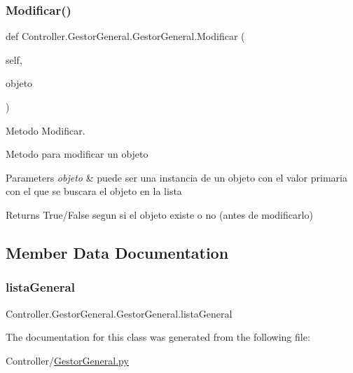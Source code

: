 \subsubsection{\texorpdfstring{Modificar()}{Modificar()}}
{\footnotesize\ttfamily def Controller.\+Gestor\+General.\+Gestor\+General.\+Modificar (\begin{DoxyParamCaption}\item[{}]{self,  }\item[{}]{objeto }\end{DoxyParamCaption})}



Metodo Modificar. 

Metodo para modificar un objeto 
\begin{DoxyParams}{Parameters}
{\em objeto} & puede ser una instancia de un objeto con el valor primaria con el que se buscara el objeto en la lista \\
\hline
\end{DoxyParams}
\begin{DoxyReturn}{Returns}
True/\+False segun si el objeto existe o no (antes de modificarlo) 
\end{DoxyReturn}


\subsection{Member Data Documentation}
\mbox{\label{class_controller_1_1_gestor_general_1_1_gestor_general_ab452eb1d569c4a9dba41ae21c833c296}} 
\subsubsection{\texorpdfstring{lista\+General}{listaGeneral}}
{\footnotesize\ttfamily Controller.\+Gestor\+General.\+Gestor\+General.\+lista\+General}



The documentation for this class was generated from the following file\+:\begin{DoxyCompactItemize}
\item 
Controller/\hyperlink{_gestor_general_8py}{Gestor\+General.\+py}\end{DoxyCompactItemize}
